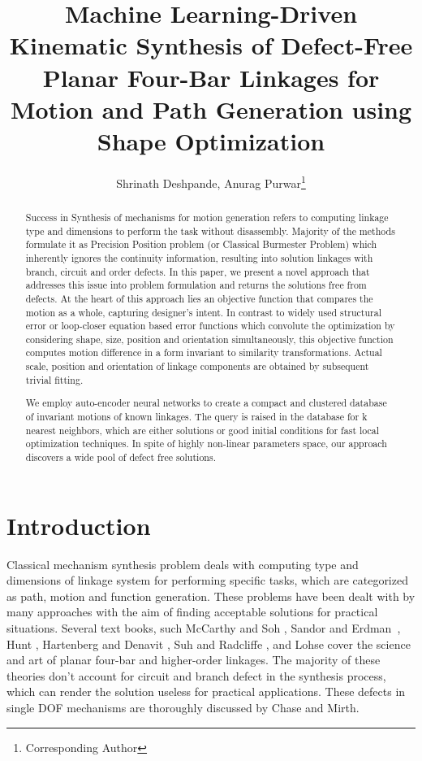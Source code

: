 \documentclass[twocolumn,10pt]{asme2e}
\title{Machine Learning-Driven Kinematic Synthesis of Defect-Free Planar Four-Bar Linkages for Motion and Path Generation using Shape Optimization}
\author{Shrinath Deshpande, Anurag Purwar\footnote{Corresponding Author}\\
    \affiliation{
    Computer-Aided Design and Innovation Lab \\
    Department of Mechanical Engineering\\
    Stony Brook University\\
    Stony Brook, New York, 11794-2300
    }
   }
\begin{document}
\maketitle

\begin{abstract}
Success in Synthesis of mechanisms for motion generation refers to computing linkage type and dimensions to perform the task without disassembly.
Majority of the methods formulate it as Precision Position problem (or Classical Burmester Problem) which inherently ignores the continuity information,
resulting into solution linkages with branch, circuit and order defects.
In this paper, we present a novel approach that addresses this issue into problem formulation and returns the solutions free from defects.
At the heart of this approach lies an objective function that compares the motion as a whole, capturing designer's intent.
In contrast to widely used structural error or loop-closer equation based error functions which convolute the optimization by considering shape, size, position and orientation simultaneously, this objective function computes motion difference in a form invariant to similarity transformations.
Actual scale, position and orientation of linkage components are obtained by subsequent trivial fitting.

We employ auto-encoder neural networks to create a compact and clustered database of invariant motions of known linkages.
The query is raised in the database for k nearest neighbors, which are either solutions or good initial conditions for fast local optimization techniques.
In spite of highly non-linear parameters space, our approach discovers a wide pool of defect free solutions.
\end{abstract}

\section{Introduction}
Classical mechanism synthesis problem deals with computing type and dimensions of linkage system for performing specific tasks, which are categorized as path, motion and function generation.
These problems have been dealt with by many approaches with the aim of finding acceptable solutions for practical situations.
Several text books, such McCarthy and Soh \cite{sohmccarthy}, Sandor and Erdman~\cite{Sandor}, Hunt \cite{Hunt78}, Hartenberg and Denavit \cite{Hartenberg},  Suh and Radcliffe \cite{Suh78}, and Lohse \cite{lohse2013} cover the science and art of planar four-bar and higher-order linkages.
The majority of these theories don't account for circuit and branch defect in the synthesis process, which can render the solution useless for practical applications.
These defects in single DOF mechanisms are thoroughly discussed by Chase and Mirth\cite{chasemirth}.
\end{document}

